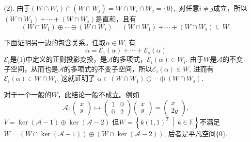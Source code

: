 (2). 由于$(W\cap W_i) \cap (W\cap W_j) = W \cap W_i \cap W_j = \{0\},$ 对任意$i\neq j$成立，所以$(W \cap W_1) +\cdots+ (W \cap W_s)$是直和，且有
$$(W \cap W_1) \oplus\cdots\oplus (W \cap W_s) = (W \cap W_1) +\cdots+ (W \cap W_s) \subseteq W.$$

下面证明另一边的包含关系。任取$\alpha \in W$, 有
$$\alpha = \mathscr{E}_1(\alpha) + \cdots + \mathscr{E}_s(\alpha)$$
$\mathscr{E}_i$是(1)中定义的正则投影变换，是$\mathscr{A}$的多项式，$\mathscr{E}_i(\alpha) \in W_i$. 由于$W$是$\mathscr{A}$的不变子空间，从而也是$\mathscr{A}$的多项式的不变子空间，所以$\mathscr{E}_i(\alpha) \in W$, 进而有$\mathscr{E}_i(\alpha) \in W\cap W_i$. 这就证明了
$\alpha \in (W \cap W_1) \oplus\cdots\oplus (W \cap W_s)$.

对于一个一般的$W$，此结论一般不成立。例如
$$\mathscr{A}: \begin{pmatrix} x \\ y \end{pmatrix} \mapsto \begin{pmatrix} 1 & 0 \\ 0 & 2 \end{pmatrix} \begin{pmatrix} x \\ y \end{pmatrix} = \begin{pmatrix} x \\ 2y \end{pmatrix},$$
$V = \ker (\mathscr{A} - 1) \oplus \ker (\mathscr{A} - 2)$
但$W = \left\{ k(1,1)^T \ \middle|\ k\in\mathbb{F} \right\}$不满足
$W = (W \cap \ker (\mathscr{A} - 1)) \oplus (W \cap \ker (\mathscr{A} - 2))$, 后者是平凡空间$\{0\}$.


